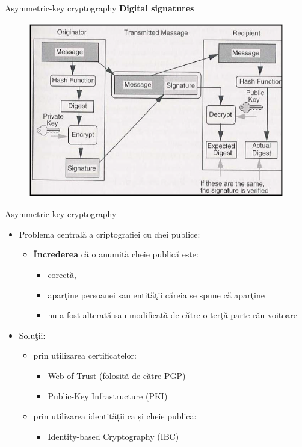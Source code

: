 \documentclass[pdf]{beamer}
\begin{document}
\begin{frame}{Asymmetric-key cryptography}
\textbf{Digital signatures}
\begin{figure}[t]
\centering
\includegraphics[scale=0.5]{Images/signcs}
\end{figure}
\end{frame}



\begin{frame}{Asymmetric-key cryptography}
\begin{itemize}
\item
Problema centrală a criptografiei cu chei publice:
\begin{itemize}
\item
\textbf{Încrederea} că o anumită cheie publică este:
\begin{itemize}
\item
corectă, 
\item
aparţine persoanei sau entităţii căreia se spune că aparţine 
\item
nu a fost alterată sau modificată de către o terţă parte rău-voitoare
\end{itemize}
\end{itemize}

\item
Soluţii:
\begin{itemize}
\item
prin utilizarea certificatelor:
\begin{itemize}
\item
Web of Trust (folosită de către PGP)
\item
Public-Key Infrastructure (PKI)
\end{itemize}
\item
prin utilizarea identității ca și cheie publică:
\begin{itemize}
\item
Identity-based Cryptography (IBC)
\end{itemize}
\end{itemize}
\end{itemize}
\end{frame}
\end{document}
